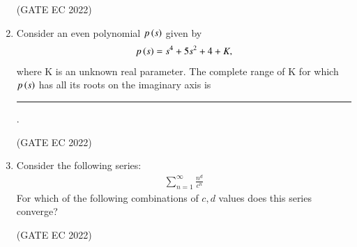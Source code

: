 \documentclass[journal,12pt,onecolumn]{IEEEtran}
\theoremstyle{remark}
\begin{document}
\begin{enumerate}
    \hfill{(GATE EC 2022)}
    \begin{enumerate}
    \end{enumerate}

    \item Consider an even polynomial $p\left(s\right)$ given by
    \begin{align*}
    p\left(s\right) = s^4 + 5s^2 + 4 + K,
    \end{align*} 
    where K is an unknown real parameter. The complete range of K for which $p\left(s\right)$ has all its roots on the imaginary axis is \rule{2cm}{0.4pt}.
    
    \hfill{(GATE EC 2022)}
    \begin{enumerate}
    \end{enumerate}

    \item Consider the following series:
    \begin{align*}
    \sum_{n=1}^{\infty} \frac{n^d}{c^n} 
    \end{align*}
    For which of the following combinations of $c, d$ values does this series converge?
    
    \hfill{(GATE EC 2022)}
    \begin{enumerate}
    \end{enumerate}


\end{enumerate}
\end{document}
